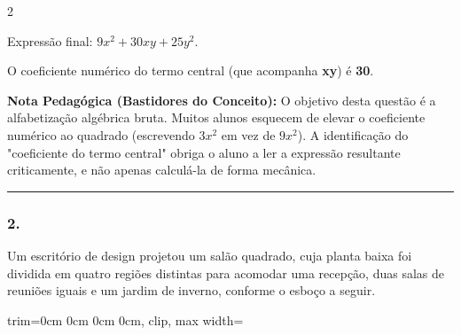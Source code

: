 \begin{multicols*}{2}
\begin{tcolorbox}[colback=CorTitUm!5, colframe=CorTitUm, boxrule=1pt, arc=4pt, left=6pt, right=6pt, top=6pt, bottom=6pt]
    Expressão final: $ 9x^2 + 30xy + 25y^2 $.
    
    O coeficiente numérico do termo central (que acompanha \textbf{xy}) é \textbf{30}.
    \end{tcolorbox}
    \vspace{0.15cm}
    
    \begin{boxexplicacao}
    \textbf{Nota Pedagógica (Bastidores do Conceito):} O objetivo desta questão é a alfabetização algébrica bruta. Muitos alunos esquecem de elevar o coeficiente numérico ao quadrado (escrevendo $3x^2$ em vez de $9x^2$). A identificação do "coeficiente do termo central" obriga o aluno a ler a expressão resultante criticamente, e não apenas calculá-la de forma mecânica.
    \end{boxexplicacao}
\fi

\par\vspace{\espacoQuestao}

\noindent\textcolor{CorLinha}{\rule{\linewidth}{0.5pt}} 
\par\vspace{\espacoPreQuestao}
\subsubsection*{2.} 
\begin{enunciadoLiteral}
Um escritório de design projetou um salão quadrado, cuja planta baixa foi dividida em quatro regiões distintas para acomodar uma recepção, duas salas de reuniões iguais e um jardim de inverno, conforme o esboço a seguir.

\begin{center}
\begin{adjustbox}{trim=0cm 0cm 0cm 0cm, clip, max width=\larguraTikz}
\end{adjustbox}
\end{center}
\end{enunciadoLiteral}
\end{multicols*}
